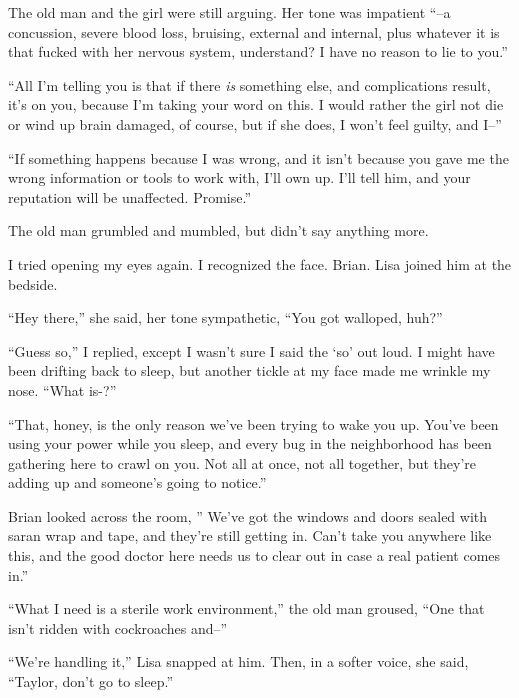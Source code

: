 The old man and the girl were still arguing.  Her tone was impatient ``--a concussion, severe blood loss, bruising, external and internal, plus whatever it is that fucked with her nervous system, understand?  I have no reason to lie to you.''



``All I'm telling you is that if there \emph{is} something else, and complications result, it's on you, because I'm taking your word on this.  I would rather the girl not die or wind up brain damaged, of course, but if she does, I won't feel guilty, and I--''



``If something happens because I was wrong, and it isn't because you gave me the wrong information or tools to work with, I'll own up.  I'll tell him, and your reputation will be unaffected.  Promise.''



The old man grumbled and mumbled, but didn't say anything more.



I tried opening my eyes again.  I recognized the face.  Brian.  Lisa joined him at the bedside.



``Hey there,'' she said, her tone sympathetic, ``You got walloped, huh?''



``Guess so,'' I replied, except I wasn't sure I said the `so' out loud.  I might have been drifting back to sleep, but another tickle at my face made me wrinkle my nose.  ``What is-?''



``That, honey, is the only reason we've been trying to wake you up.  You've been using your power while you sleep, and every bug in the neighborhood has been gathering here to crawl on you.  Not all at once, not all together, but they're adding up and someone's going to notice.''



Brian looked across the room, '' We've got the windows and doors sealed with saran wrap and tape, and they're still getting in.  Can't take you anywhere like this, and the good doctor here needs us to clear out in case a real patient comes in.''



``What I need is a sterile work environment,'' the old man groused, ``One that isn't ridden with cockroaches and--''



``We're handling it,'' Lisa snapped at him.  Then, in a softer voice, she said, ``Taylor, don't go to sleep.''



